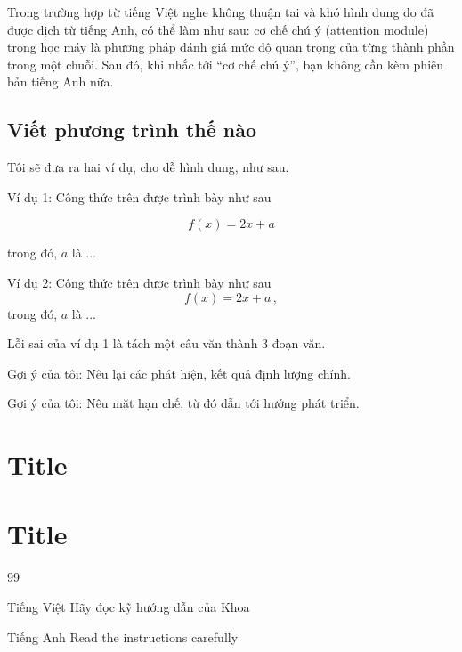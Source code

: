 \documentclass[thesis]{femathesis}
\begin{document}
Trong trường hợp từ tiếng Việt nghe không thuận tai và khó hình dung do đã được dịch từ tiếng Anh, có thể làm như sau: cơ chế chú ý (attention module) trong học máy là phương pháp đánh giá mức độ quan trọng của từng thành phần trong một chuỗi. Sau đó, khi nhắc tới ``cơ chế chú ý'', bạn không cần kèm phiên bản tiếng Anh nữa.

\section{Viết phương trình thế nào}
Tôi sẽ đưa ra hai ví dụ, cho dễ hình dung, như sau.

\vspace{1cm}
Ví dụ 1: Công thức trên được trình bày như sau

\begin{equation}
    f(x) = 2x+a
\end{equation}

trong đó, $a$ là ...

\vspace{0.5cm}
Ví dụ 2: Công thức trên được trình bày như sau
\begin{equation}
    f(x) = 2x+a\,,
\end{equation}
trong đó, $a$ là ...

\vspace{1cm}
Lỗi sai của ví dụ 1 là tách một câu văn thành 3 đoạn văn.


Gợi ý của tôi: Nêu lại các phát hiện, kết quả định lượng chính.

Gợi ý của tôi: Nêu mặt hạn chế, từ đó dẫn tới hướng phát triển.


\appendix
\chapter{Title}
\blindtext

\chapter{Title}
\blindtext


\begin{thebibliography}{99}
\begin{bibsection}{Tiếng Việt}
    Hãy đọc kỹ hướng dẫn của Khoa
\end{bibsection}

\begin{bibsection}{Tiếng Anh}
	Read the instructions carefully
\end{bibsection}
\end{thebibliography}
\end{document}
